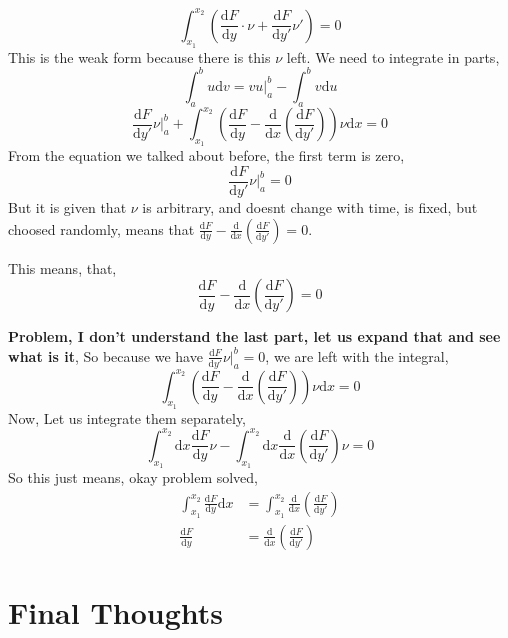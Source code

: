 \documentclass[a4paper, 11pt,twoside]{memoir}
\begin{document}
\[ 
    \int_{x_1}^{x_2} \left( \frac{\mathrm{d} F}{\mathrm{d} y} \cdot \nu + \frac{\mathrm{d} F}{\mathrm{d} y'} \nu'  \right)  = 0
\] This is the weak form because there is this $\nu$ left. We need to integrate in parts,
\[ 
\int_{ a }^{b}  u \mathrm{d}  v = vu|_a^b - \int_{a}^{b} v \mathrm{d}  u  
\]
\[ 
    \frac{\mathrm{d} F}{\mathrm{d} y'} \nu |_a^b + \int_{x_1}^{x_2}  \left( \frac{\mathrm{d} F}{\mathrm{d} y} - \frac{\mathrm{d} }{\mathrm{d} x} \left( \frac{\mathrm{d} F}{\mathrm{d} y'} \right)  \right) \nu \mathrm{d} x = 0 
\] From the equation we talked about before,  the first term is zero,
\[ 
\frac{\mathrm{d} F}{\mathrm{d} y'} \nu|_a^b = 0
\]
But it is given that $\nu$ is arbitrary, and doesnt change with time, is fixed, but choosed randomly, means that $\frac{\mathrm{d} F}{\mathrm{d} y} - \frac{\mathrm{d} }{\mathrm{d} x} \left( \frac{\mathrm{d} F}{\mathrm{d} y'} \right)  = 0$.

This means, that,
\[ 
    \frac{\mathrm{d} F}{\mathrm{d} y } - \frac{\mathrm{d} }{\mathrm{d} x} \left( \frac{\mathrm{d} F}{\mathrm{d} y'} \right)  = 0
\]

\textbf{Problem, I don't understand the last part, let us expand that and see what is it}, 
So because we have $\frac{\mathrm{d} F}{\mathrm{d} y'} \nu |_a^b = 0$, we are left with the integral,
\[ 
    \int_{x_1}^{x_2} \left( \frac{\mathrm{d} F}{\mathrm{d} y} - \frac{\mathrm{d} }{\mathrm{d} x} \left( \frac{\mathrm{d} F}{\mathrm{d} y'} \right)  \right) \nu \mathrm{d}  x = 0 
\] Now, Let us integrate them separately,  
\[ 
\int_{x_1}^{x_2} \mathrm{d}  x \frac{\mathrm{d} F}{\mathrm{d} y} \nu - 
\int_{x_1}^{x_2} \mathrm{d} x \frac{\mathrm{d} }{\mathrm{d} x} \left( \frac{\mathrm{d} F}{\mathrm{d} y'} \right) \nu  = 0 
\] 
So this just means, okay problem solved,
\begin{align*}
    \int_{x_1}^{x_2} \frac{\mathrm{d} F}{\mathrm{d} y} \mathrm{d} x &= \int_{x_1}^{x_2} \frac{\mathrm{d} }{\mathrm{d} x} \left( \frac{\mathrm{d} F}{\mathrm{d} y'} \right)   \\
    \frac{\mathrm{d} F}{\mathrm{d} y} &= \frac{\mathrm{d} }{\mathrm{d} x} \left( \frac{\mathrm{d} F}{\mathrm{d} y'} \right) 
\end{align*}

\section{Final Thoughts}
\end{document}

